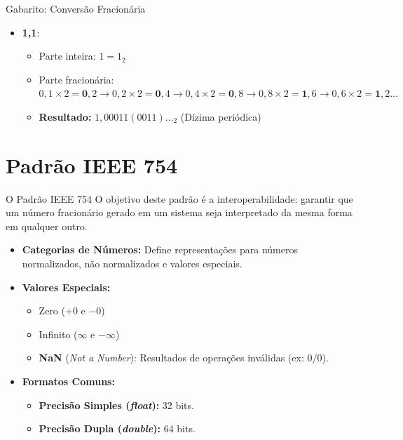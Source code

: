 \begin{frame}{Gabarito: Conversão Fracionária}
\begin{itemize}
        \item[\textbf{d)}] \textbf{1,1}:
              \begin{itemize}
                  \item Parte inteira: $1 = 1_2$
                  \item Parte fracionária: $0,1 \times 2 = \mathbf{0},2 \rightarrow 0,2 \times 2 = \mathbf{0},4 \rightarrow 0,4 \times 2 = \mathbf{0},8 \rightarrow 0,8 \times 2 = \mathbf{1},6 \rightarrow 0,6 \times 2 = \mathbf{1},2 \dots$
                  \item \textbf{Resultado:} $1,00011(0011)\dots_2$ (Dízima periódica)
              \end{itemize}
    \end{itemize}
\end{frame}

\section{Padrão IEEE 754}

\begin{frame}{O Padrão IEEE 754}
    O objetivo deste padrão é a interoperabilidade: garantir que um número fracionário gerado em um sistema seja interpretado da mesma forma em qualquer outro.

    \begin{itemize}
        \item \textbf{Categorias de Números:} Define representações para números normalizados, não normalizados e valores especiais.
        \item \textbf{Valores Especiais:}
              \begin{itemize}
                  \item Zero ($+0$ e $-0$)
                  \item Infinito ($\infty$ e $-\infty$)
                  \item \textbf{NaN} (\textit{Not a Number}): Resultados de operações inválidas (ex: $0/0$).
              \end{itemize}
        \item \textbf{Formatos Comuns:}
              \begin{itemize}
                  \item \textbf{Precisão Simples (\textit{float}):} 32 bits.
                  \item \textbf{Precisão Dupla (\textit{double}):} 64 bits.
              \end{itemize}
    \end{itemize}
\end{frame}

